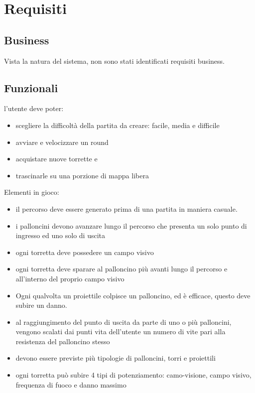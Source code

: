 \section{Requisiti}
\subsection{Business}
Vista la natura del sistema, non sono stati identificati requisiti business. 
\subsection{Funzionali}
l'utente deve poter: 
\begin{itemize}
    \item scegliere la difficoltà della partita da creare: facile, media e difficile
    \item avviare e velocizzare un round
    \item acquistare nuove torrette e
    \item trascinarle su una porzione di mappa libera
\end{itemize}
Elementi in gioco: 
\begin{itemize}
    \item il percorso deve essere generato prima di una partita in maniera casuale.
    \item i palloncini devono avanzare lungo il percorso che presenta un solo punto di ingresso ed uno solo di uscita
    \item ogni torretta deve possedere un campo visivo
    \item ogni torretta deve sparare al palloncino più avanti lungo il percorso e all'interno del proprio campo visivo
    \item Ogni qualvolta un proiettile colpisce un palloncino, ed è efficace, questo deve subire un danno. 
    \item al raggiungimento del punto di uscita da parte di uno o più palloncini, vengono scalati dai punti vita dell'utente un numero di vite pari alla resistenza del palloncino stesso
    \item devono essere previste più tipologie di palloncini, torri e proiettili
    \item ogni torretta può subire 4 tipi di potenziamento: camo-visione, campo visivo, frequenza di fuoco e danno massimo
\end{itemize}